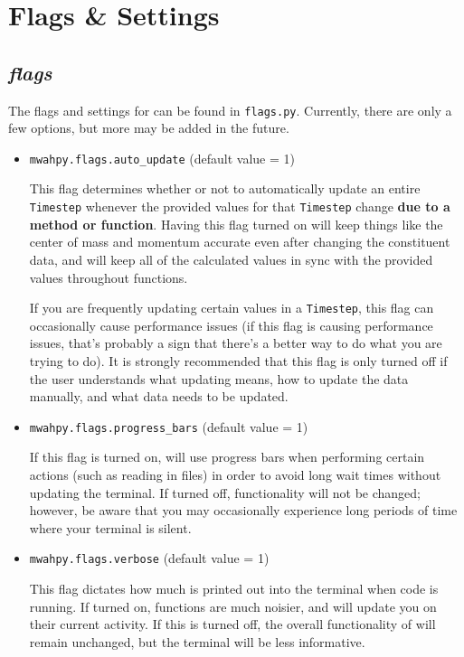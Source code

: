 \documentclass{article}
\begin{document}
\newpage

\section{Flags \& Settings}

\subsection{\textit{flags}}

The flags and settings for \mwahpy can be found in \verb!flags.py!. Currently, there are only a few options, but more may be added in the future. 

\begin{itemize}

\item \verb!mwahpy.flags.auto_update! (default value = 1)

This flag determines whether or not to automatically update an entire \verb!Timestep! whenever the provided values for that \verb!Timestep! change \textbf{due to a \mwahpy method or function}. Having this flag turned on will keep things like the center of mass and momentum accurate even after changing the constituent data, and will keep all of the calculated values in sync with the provided values throughout \mwahpy functions. 

If you are frequently updating certain values in a \verb!Timestep!, this flag can occasionally cause performance issues (if this flag is causing performance issues, that's probably a sign that there's a better way to do what you are trying to do). It is strongly recommended that this flag is only turned off if the user understands what updating means, how to update the data manually, and what data needs to be updated. 

\item \verb!mwahpy.flags.progress_bars! (default value = 1)

If this flag is turned on, \mwahpy will use progress bars when performing certain actions (such as reading in files) in order to avoid long wait times without updating the terminal. If turned off, \mwahpy functionality will not be changed; however, be aware that you may occasionally experience long periods of time where your terminal is silent.

\item \verb!mwahpy.flags.verbose! (default value = 1)

This flag dictates how much is printed out into the terminal when \mwahpy code is running. If turned on, functions are much noisier, and will update you on their current activity. If this is turned off, the overall functionality of \mwahpy will remain unchanged, but the terminal will be less informative. 

\end{itemize}
\end{document}

